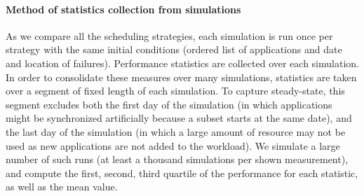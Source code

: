 \paragraph*{Method of statistics collection from simulations}
As we compare all the scheduling strategies, each simulation is run
once per strategy with the same initial conditions (ordered list of
applications and date and location of failures). Performance
statistics are collected over each simulation. In order to consolidate
these measures over many simulations, statistics are taken over a
segment of fixed length of each simulation.  To capture steady-state,
this segment excludes both
the first day of the simulation (in which applications might be
synchronized artificially because a subset starts at the same date),
and the last day of the simulation (in which a large amount of
resource may not be used as new applications are not added to the
workload). We simulate a large number of such runs (at least a
thousand simulations per shown measurement), and compute the first,
second, third quartile of the performance for each statistic, as well
as the mean value.
